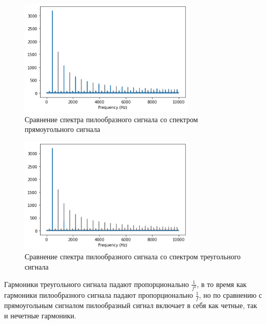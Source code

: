 \documentclass[a4paper, 12pt]{report}
\begin{document}
	\begin{figure}[H]
		\centering
		\includegraphics[width=0.75\textwidth]{sr1.png}
		\caption{Сравнение спектра пилообразного сигнала со спектром прямоугольного сигнала}
		\label{fig:sr1}
	\end{figure}
	\begin{figure}[H]
		\centering
		\includegraphics[width=0.75\textwidth]{sr2.png}
		\caption{Сравнение спектра пилообразного сигнала со спектром треугольного сигнала}
		\label{fig:sr2}
	\end{figure}
	Гармоники треугольного сигнала падают пропорционально $\frac{1}{f^2}$, в то время как гармоники пилообразного сигнала падают пропорционально $\frac{1}{f}$, но по сравнению с прямоугольным сигналом пилообразный сигнал включает в себя как четные, так и нечетные гармоники.
\end{document}
